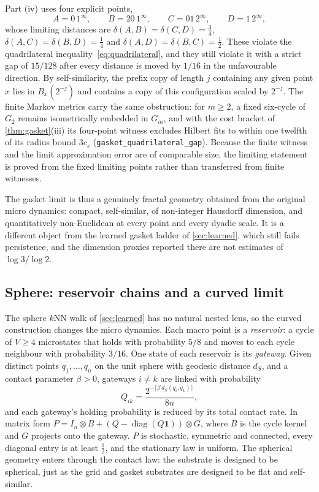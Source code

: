 \documentclass[11pt]{article}
\newcommand{\lean}[1]{\nolinkurl{#1}}
\newcommand{\one}{\mathbf{1}}
\begin{document}
Part (iv) uses four explicit points,
\begin{equation}
A=0\,1^{\infty},\qquad B=20\,1^{\infty},\qquad C=01\,2^{\infty},\qquad D=1\,2^{\infty},
\end{equation}
whose limiting distances are $\delta(A,B)=\delta(C,D)=\tfrac34$, $\delta(A,C)=\delta(B,D)=\tfrac14$ and $\delta(A,D)=\delta(B,C)=\tfrac12$.
These violate the quadrilateral inequality~\eqref{eq:quadrilateral}, and they still violate it with a strict gap of $15/128$ after every distance is moved by $1/16$ in the unfavourable direction.
By self-similarity, the prefix copy of length $j$ containing any given point $x$ lies in $B_x(2^{-j})$ and contains a copy of this configuration scaled by $2^{-j}$.
The finite Markov metrics carry the same obstruction: for $m\ge2$, a fixed six-cycle of $G_2$ remains isometrically embedded in $G_m$, and with the cost bracket of \cref{thm:gasket}(iii) its four-point witness excludes Hilbert fits to within one twelfth of its radius bound $3c_s$ (\lean{gasket_quadrilateral_gap}).
Because the finite witness and the limit approximation error are of comparable size, the limiting statement is proved from the fixed limiting points rather than transferred from finite witnesses.

The gasket limit is thus a genuinely fractal geometry obtained from the original micro dynamics: compact, self-similar, of non-integer Hausdorff dimension, and quantitatively non-Euclidean at every point and every dyadic scale.
It is a different object from the learned gasket ladder of \cref{sec:learned}, which still fails persistence, and the dimension proxies reported there are not estimates of $\log3/\log2$.

\subsection{Sphere: reservoir chains and a curved limit}
\label{sec:sphere}

The sphere $k$NN walk of \cref{sec:learned} has no natural nested lens, so the curved construction changes the micro dynamics.
Each macro point is a \emph{reservoir}: a cycle of $V\ge4$ microstates that holds with probability $5/8$ and moves to each cycle neighbour with probability $3/16$.
One state of each reservoir is its \emph{gateway}.
Given distinct points $q_1,\dots,q_n$ on the unit sphere with geodesic distance $d_S$, and a contact parameter $\beta>0$, gateways $i\neq k$ are linked with probability
\begin{equation}
Q_{ik}=\frac{2^{-\lceil\beta\, d_S(q_i,q_k)\rceil}}{8n},
\end{equation}
and each gateway's holding probability is reduced by its total contact rate.
In matrix form $P=I_n\otimes B+(Q-\operatorname{diag}(Q\one))\otimes G$, where $B$ is the cycle kernel and $G$ projects onto the gateway.
$P$ is stochastic, symmetric and connected, every diagonal entry is at least $\tfrac12$, and the stationary law is uniform.
The spherical geometry enters through the contact law: the substrate is designed to be spherical, just as the grid and gasket substrates are designed to be flat and self-similar.
\end{document}

